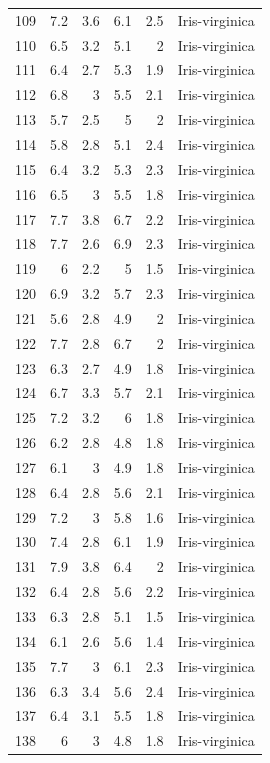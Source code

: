 \documentclass [oneside,10pt,a4paper,ngerman,BCOR10mm,headsepline,parindent,final]{scrartcl}
\begin{document}
\begin{longtable}[]{@{}rrrrrl@{}}
109 & 7.2 & 3.6 & 6.1 & 2.5 & Iris-virginica \\
110 & 6.5 & 3.2 & 5.1 & 2 & Iris-virginica \\
111 & 6.4 & 2.7 & 5.3 & 1.9 & Iris-virginica \\
112 & 6.8 & 3 & 5.5 & 2.1 & Iris-virginica \\
113 & 5.7 & 2.5 & 5 & 2 & Iris-virginica \\
114 & 5.8 & 2.8 & 5.1 & 2.4 & Iris-virginica \\
115 & 6.4 & 3.2 & 5.3 & 2.3 & Iris-virginica \\
116 & 6.5 & 3 & 5.5 & 1.8 & Iris-virginica \\
117 & 7.7 & 3.8 & 6.7 & 2.2 & Iris-virginica \\
118 & 7.7 & 2.6 & 6.9 & 2.3 & Iris-virginica \\
119 & 6 & 2.2 & 5 & 1.5 & Iris-virginica \\
120 & 6.9 & 3.2 & 5.7 & 2.3 & Iris-virginica \\
121 & 5.6 & 2.8 & 4.9 & 2 & Iris-virginica \\
122 & 7.7 & 2.8 & 6.7 & 2 & Iris-virginica \\
123 & 6.3 & 2.7 & 4.9 & 1.8 & Iris-virginica \\
124 & 6.7 & 3.3 & 5.7 & 2.1 & Iris-virginica \\
125 & 7.2 & 3.2 & 6 & 1.8 & Iris-virginica \\
126 & 6.2 & 2.8 & 4.8 & 1.8 & Iris-virginica \\
127 & 6.1 & 3 & 4.9 & 1.8 & Iris-virginica \\
128 & 6.4 & 2.8 & 5.6 & 2.1 & Iris-virginica \\
129 & 7.2 & 3 & 5.8 & 1.6 & Iris-virginica \\
130 & 7.4 & 2.8 & 6.1 & 1.9 & Iris-virginica \\
131 & 7.9 & 3.8 & 6.4 & 2 & Iris-virginica \\
132 & 6.4 & 2.8 & 5.6 & 2.2 & Iris-virginica \\
133 & 6.3 & 2.8 & 5.1 & 1.5 & Iris-virginica \\
134 & 6.1 & 2.6 & 5.6 & 1.4 & Iris-virginica \\
135 & 7.7 & 3 & 6.1 & 2.3 & Iris-virginica \\
136 & 6.3 & 3.4 & 5.6 & 2.4 & Iris-virginica \\
137 & 6.4 & 3.1 & 5.5 & 1.8 & Iris-virginica \\
138 & 6 & 3 & 4.8 & 1.8 & Iris-virginica \\

\end{longtable}
\end{document}
